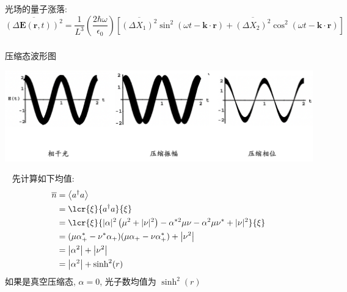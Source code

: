 \begin{frame}
 \frametitle{}
      光场的量子涨落:
      \[ \overline{ (\Delta \mathbf{E}(\mathbf{r},t))^2} = \frac{1}{L^3} (\frac{2\hbar \omega}{\epsilon_0}) [ \overline{ (\Delta X_1)^2} \sin ^2 (\omega t - \mathbf{k}\cdot \mathbf{r}) + \overline{ (\Delta X_2)^2} \cos ^2 (\omega t - \mathbf{k}\cdot \mathbf{r}) ]\]
\end{frame}

   \begin{frame}
    \frametitle{}
    压缩态波形图
      \begin{center}
           \includegraphics[width=1.0\textwidth]{figs/12.png}
      \end{center}   
   \end{frame}

\begin{frame}
    \例 [6.  求压缩态光子数的均值和涨落]{
    }
     \解~ 先计算如下均值: 
      \[ \begin{aligned}
        \overline{n} & = \left\langle a^{\dagger} a\right\rangle  \\ 
        &= \lcr{\xi} {a^{\dagger} a} {\xi} \\ 
        &= \lcr{\xi} {|\alpha|^{2}\left(\mu^{2}+|\nu|^{2}\right)-\alpha^{* 2} \mu \nu-\alpha^{2} \mu \nu^{*}+|\nu|^{2}} {\xi} \\ 
        &= (\mu \alpha^* _{+} - \nu^* \alpha _{+})(\mu \alpha _{+} - \nu \alpha ^* _{+}) + \left| \nu ^2 \right| \\ 
        &= \left|\alpha^2\right| + \left| \nu ^2 \right| \\ 
        &= \left|\alpha^2\right| + \sinh ^2 (r)
       \end{aligned}\]  
       如果是真空压缩态, $\alpha=0 $, 光子数均值为 $\sinh ^2 (r)$  
   \end{frame}

